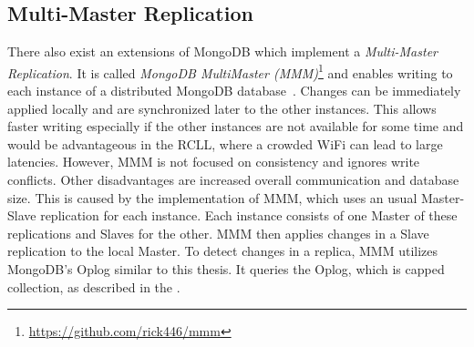 \subsection{Multi-Master Replication}
\label{sec:mongodb-multi-master}
There also exist an extensions of MongoDB which implement a
\emph{Multi-Master Replication}. It is called \emph{MongoDB
  MultiMaster (MMM)}\footnote{\url{https://github.com/rick446/mmm}}
and enables writing to each instance of a distributed MongoDB
database~\cite{mongodb-multi-master}. Changes can be immediately
applied locally and are synchronized later to the other
instances. This allows faster writing especially if the other
instances are not available for some time and would be advantageous in
the RCLL, where a crowded WiFi can lead to large latencies. However,
MMM is not focused on consistency and ignores write conflicts. Other
disadvantages are increased overall communication and database
size. This is caused by the implementation of MMM, which uses an usual
Master-Slave replication for each instance. Each instance consists of
one Master of these replications and Slaves for the other. MMM then
applies changes in a Slave replication to the local Master.  To detect
changes in a replica, MMM utilizes MongoDB's Oplog similar to this
thesis. It queries the Oplog, which is capped collection, as described
in the .

